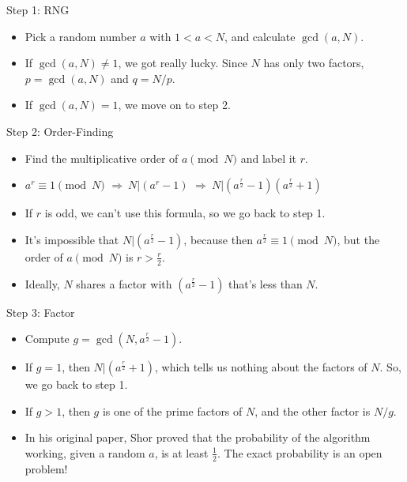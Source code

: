 \documentclass[handout, aspectratio=169]{beamer}
\begin{document}
\begin{frame}{Step 1: RNG}
    \begin{itemize}
        \item Pick a random number $a$ with $1<a<N$, and calculate $\gcd(a, N)$. \pause
        \item If $\gcd(a, N)\not=1$, we got really lucky. Since $N$ has only two factors, $p=\gcd(a,N)$ and $q=N/p$. \pause
        \item If $\gcd(a,N)=1$, we move on to step 2.
    \end{itemize}
\end{frame}

\begin{frame}{Step 2: Order-Finding}
    \begin{itemize}
        \item Find the multiplicative order of $a\pmod N$ and label it $r$. \pause
        \item $a^r\equiv 1\pmod N$ \pause $\Rightarrow\ N|(a^r-1)$ \pause $\Rightarrow\ N|(a^\frac{r}{2}-1)(a^\frac{r}{2}+1)$ \pause
        \item If $r$ is odd, we can't use this formula, so we go back to step 1. \pause
        \item It's impossible that $N|(a^\frac{r}{2}-1)$, because then $a^\frac{r}{2}\equiv 1\pmod N$, but the order of $a\pmod N$ is $r>\frac{r}{2}$. \pause
        \item Ideally, $N$ shares a factor with $(a^\frac{r}{2}-1)$ that's less than $N$.
    \end{itemize}
\end{frame}

\begin{frame}{Step 3: Factor}
    \begin{itemize}
        \item Compute $g=\gcd(N, a^\frac{r}{2}-1)$. \pause
        \item If $g=1$, then $N|(a^\frac{r}{2}+1)$, which tells us nothing about the factors of $N$. So, we go back to step 1. \pause
        \item If $g>1$, then $g$ is one of the prime factors of $N$, and the other factor is $N/g$. \pause
        \item In his original paper, Shor proved that the probability of the algorithm working, given a random $a$, is at least $\frac{1}{2}$. The exact probability is an open problem!
    \end{itemize}
\end{frame}
\end{document}

